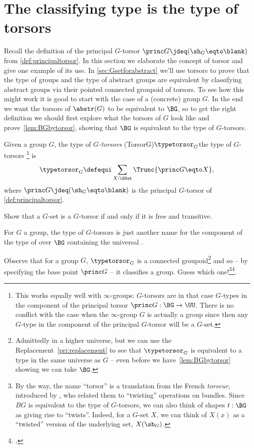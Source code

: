 \section{The classifying type is the type of torsors}
\label{sec:torsors}
Recall the definition of the principal $G$-torsor 
$\princ G \jdeq (\sh_G \eqto \blank)$ from \cref{def:principaltorsor}.
In this section we elaborate the concept of torsor and give one example
of its use.
In \cref{sec:Gsetforabstract} we'll use torsors to prove that the type of groups and the type of abstract groups are equivalent by classifying abstract groups via their pointed connected groupoid of torsors.  To see how this might work it is good to start with the case of a (concrete) group $G$.
In the end we want the torsors of $\abstr(G)$ to be equivalent to $\BG$, so to get the right definition we should first explore what the torsors of $G$ look like and prove~\cref{lem:BGbytorsor}, showing that $\BG$ is equivalent to the type of $G$-torsors.
\begin{definition}\label{def:Gtorsor}
  Given a group $G$, the type of \emph{$G$-torsors}%
  \glossary(TorsorG){$\protect\typetorsor_G$}{the type of $G$-torsors}%
  \footnote{This works equally well with $\infty$-groups: $G$-torsors are in that case $G$-types in the component of the principal torsor $\princ G:\BG\to\UU$. There is no conflict with the case when the $\infty$-group $G$ is actually a group since then any $G$-type in the component of the principal $G$-torsor will be a $G$-set.}
  is
  \[
    \typetorsor_G\defequi\sum_{X:\GSet}\Trunc{\princ G \eqto X},
  \]
  where $\princ G \jdeq (\sh_G \eqto \blank)$ is the 
  principal $G$-torsor of \cref{def:principaltorsor}.
\end{definition}

\begin{xca}\label{xca:torsor=free+transitive}
  Show that a $G$-set is a $G$-torsor if and only if it is free and transitive.
\end{xca}

\begin{remark}
  For $G$ a group, the type of $G$-torsors is just another name for the component of the type of \coverings over $\BG$ containing the universal \covering.

  Observe that for a group $G$, $\typetorsor_G$ is a connected groupoid\footnote{Admittedly in a higher universe, but we can use the
    Replacement~\cref{pri:replacement} to see that $\typetorsor_G$ is equivalent
    to a type in the same universe as $G$ -- even before we
    have~\cref{lem:BGbytorsor} showing we can take $\BG$.}
  and so -- by specifying the base point $\princ G$ -- it classifies a group.
  Guess which one!\footnote{%
    By the way, the name ``torsor'' is a translation from the French \emph{torseur},
    introduced by \citeauthor{giraud1971},\footnotemark{} who
    related them to “twisting” operations on bundles.
    Since $BG$ is equivalent to the type of $G$-torsors,
    we can also think of shapes $t:\BG$ as giving rise to “twists”.
    Indeed, for a $G$-set $X$,
    we can think of $X(x)$ as a ``twisted'' version of the underlying set,
    $X(\sh_G)$.}\footcitetext{giraud1971}.
\end{remark}



